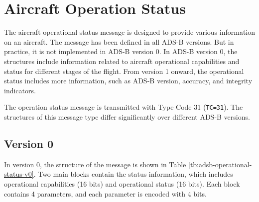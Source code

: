 \chapter{Aircraft Operation Status}\label{aircraft-operation-status}

The aircraft operational status message is designed to provide various information on an aircraft. The message has been defined in all ADS-B versions. But in practice, it is not implemented in ADS-B version 0. In ADS-B version 0, the structures include information related to aircraft operational capabilities and status for different stages of the flight. From version 1 onward, the operational status includes more information, such as ADS-B version, accuracy, and integrity indicators.

The operation status message is transmitted with Type Code 31 (\texttt{TC=31}). The structures of this message type differ significantly over different ADS-B versions.

\section{Version 0}

In version 0, the structure of the message is shown in Table \ref{tb:adsb-operational-status-v0}. Two main blocks contain the status information, which includes operational capabilities (16 bits) and operational status (16 bits). Each block contains 4 parameters, and each parameter is encoded with 4 bits.

